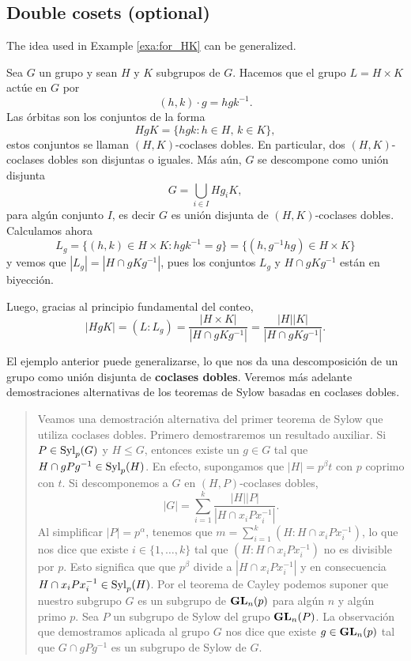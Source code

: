 \section{}

\subsection{Double cosets (optional)}

The idea used in Example \ref{exa:for_HK} can be generalized. 

\begin{example}
Sea $G$ un grupo y sean $H$ y $K$ subgrupos de $G$. Hacemos
que el grupo $L=H\times K$ actúe en $G$ por
\[
(h,k)\cdot g=hgk^{-1}.
\]
Las órbitas son los conjuntos de la forma
\[
HgK=\{hgk:h\in H,\,k\in K\},
\]
estos conjuntos se llaman $(H,K)$-coclases dobles.
En particular, dos $(H,K)$-coclases dobles son disjuntas o iguales. Más aún,
$G$ se descompone como unión disjunta
\[
G=\bigcup_{i\in I}Hg_iK,
\]
para algún conjunto $I$, es decir $G$
es unión disjunta de $(H,K)$-coclases dobles.
Calculamos ahora
\[
L_g=\{(h,k)\in H\times K:hgk^{-1}=g\}=\{(h,g^{-1}hg)\in H\times K\}
\]
y vemos que $|L_g|=|H\cap gKg^{-1}|$, pues los conjuntos $L_g$ y $H\cap gKg^{-1}$ están en biyección.

Luego,
gracias al principio fundamental del conteo,
\[
|HgK|=(L:L_g)=\frac{|H\times K|}{|H\cap gKg^{-1}|}=\frac{|H||K|}{|H\cap gKg^{-1}|}.
\]
\end{example}

El ejemplo anterior puede generalizarse, lo que nos da una descomposición
de un grupo como unión disjunta de \textbf{coclases dobles}. Veremos más adelante
demostraciones alternativas de los teoremas de Sylow basadas en
coclases dobles.

\begin{quote}
Veamos una demostración alternativa del primer teorema de Sylow
que utiliza coclases dobles.
Primero demostraremos un resultado auxiliar. Si $P\in\mathrm{Syl}_p(G)$ y $H\leq G$, entonces
existe un $g\in G$ tal que $H\cap gPg^{-1}\in\mathrm{Syl}_p(H)$. En efecto, supongamos que
$|H|=p^\beta t$ con $p$ coprimo con $t$.
Si descomponemos a $G$ en $(H,P)$-coclases dobles,
\[
|G|=\sum_{i=1}^k \frac{|H||P|}{|H\cap x_iPx_i^{-1}|}.
\]
Al simplificar $|P|=p^\alpha$, tenemos que $m=\sum_{i=1}^k(H:H\cap x_iPx_i^{-1})$, lo que nos dice
que existe $i\in\{1,\dots,k\}$ tal que
$(H:H\cap x_iPx_i^{-1})$ no es divisible por $p$. Esto significa que que
$p^\beta$ divide a $|H\cap x_iPx_i^{-1}|$ y en consecuencia $H\cap x_iPx_i^{-1}\in\mathrm{Syl}_p(H)$.
Por el teorema de Cayley podemos suponer que nuestro subgrupo $G$ es un subgrupo
de $\mathbf{GL}_n(p)$ para algún $n$ y algún primo $p$. Sea $P$ un subgrupo de Sylow
del grupo $\mathbf{GL}_n(P)$. La observación que demostramos
aplicada al grupo $G$ nos dice que existe $g\in \mathbf{GL}_n(p)$ tal que $G\cap gPg^{-1}$ es un subgrupo de
Sylow de $G$.
\end{quote}

